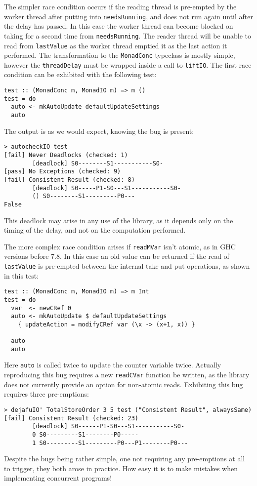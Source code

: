 The simpler race condition occurs if the reading thread is pre-empted
by the worker thread after putting into \verb|needsRunning|, and does
not run again until after the delay has passed. In this case the
worker thread can become blocked on taking for a second time from
\verb|needsRunning|. The reader thread will be unable to read from
\verb|lastValue| as the worker thread emptied it as the last action it
performed. The transformation to the \verb|MonadConc| typeclass is
mostly simple, however the \verb|threadDelay| must be wrapped inside a
call to \verb|liftIO|. The first race condition can be exhibited with
the following test:

\begin{verbatim}
test :: (MonadConc m, MonadIO m) => m ()
test = do
  auto <- mkAutoUpdate defaultUpdateSettings
  auto
\end{verbatim}

The output is as we would expect, knowing the bug is present:

\begin{verbatim}
> autocheckIO test
[fail] Never Deadlocks (checked: 1)
        [deadlock] S0--------S1-----------S0-
[pass] No Exceptions (checked: 9)
[fail] Consistent Result (checked: 8)
        [deadlock] S0-----P1-S0---S1-----------S0-
        () S0--------S1---------P0---
False
\end{verbatim}

This deadlock may arise in any use of the library, as it depends only
on the timing of the delay, and not on the computation performed.

The more complex race condition arises if \verb|readMVar| isn't
atomic, as in GHC versions before 7.8. In this case an old value can
be returned if the read of \verb|lastValue| is pre-empted between the
internal take and put operations, as shown in this test:

\begin{verbatim}
test :: (MonadConc m, MonadIO m) => m Int
test = do
  var  <- newCRef 0
  auto <- mkAutoUpdate $ defaultUpdateSettings
    { updateAction = modifyCRef var (\x -> (x+1, x)) }

  auto
  auto
\end{verbatim}

Here \verb|auto| is called twice to update the counter variable
twice. Actually reproducing this bug requires a new \verb|readCVar|
function be written, as the library does not currently provide an
option for non-atomic reads. Exhibiting this bug requires three
pre-emptions:

\begin{verbatim}
> dejafuIO' TotalStoreOrder 3 5 test ("Consistent Result", alwaysSame)
[fail] Consistent Result (checked: 23)
        [deadlock] S0------P1-S0---S1-----------S0-
        0 S0---------S1--------P0-----
        1 S0---------S1---------P0---P1--------P0---
\end{verbatim}

Despite the bugs being rather simple, one not requiring any
pre-emptions at all to trigger, they both arose in practice. How easy
it is to make mistakes when implementing concurrent programs!
